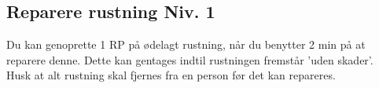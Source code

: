 \subsection*{Reparere rustning Niv. 1}
Du kan genoprette 1 RP på ødelagt rustning, når du benytter 2 min på at reparere denne. Dette kan gentages indtil rustningen fremstår 'uden skader'.\\
Husk at alt rustning skal fjernes fra en person før det kan repareres.